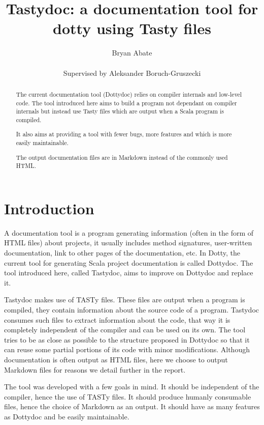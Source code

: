 \documentclass{report}
\begin{document}
\title{Tastydoc: a documentation tool for dotty using Tasty files}
\author{Bryan Abate
\\\\\small{Supervised by Aleksander Boruch-Gruszecki}}

\maketitle

\begin{abstract}
The current documentation tool (Dottydoc) relies on compiler internals and low-level code. The tool introduced here aims to build a program not dependant on compiler internals but instead use Tasty files which are output when a Scala program is compiled.

It also aims at providing a tool with fewer bugs, more features and which is more easily maintainable.

The output documentation files are in Markdown instead of the commonly used HTML.
\end{abstract}

\tableofcontents

\chapter{Introduction}

A documentation tool is a program generating information (often in the form of HTML files) about projects, it usually includes method signatures, user-written documentation, link to other pages of the documentation, etc.
In Dotty, the current tool for generating Scala project documentation is called Dottydoc. The tool introduced here, called Tastydoc, aims to improve on Dottydoc and replace it.

Tastydoc makes use of TASTy files. These files are output when a program is compiled, they contain information about the source code of a program. Tastydoc consumes such files to extract information about the code, that way it is completely independent of the compiler and can be used on its own.
The tool tries to be as close as possible to the structure proposed in Dottydoc so that it can reuse some partial portions of its code with minor modifications.
Although documentation is often output as HTML files, here we choose to output Markdown files for reasons we detail further in the report.

The tool was developed with a few goals in mind. It should be independent of the compiler, hence the use of TASTy files. It should produce humanly consumable files, hence the choice of Markdown as an output. It should have as many features as Dottydoc and be easily maintainable.
\end{document}
